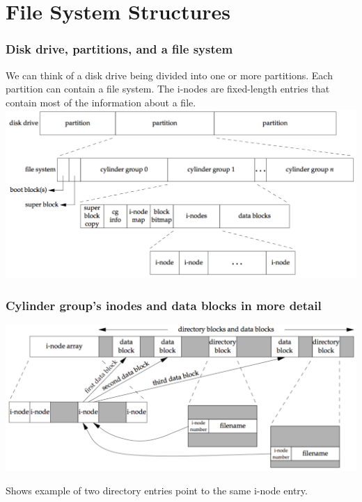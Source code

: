 \documentclass[newPxFont,sthlmFooter,nooffset]{beamer}
\begin{document}
\section{File System Structures}


\begin{frame}
  \frametitle{Disk drive, partitions, and a file system}
We can think of a disk drive being divided into one or more partitions. Each partition can contain a file system. The i-nodes are fixed-length entries that contain most of the information about a file.
\includegraphics[width=\textwidth]{figure/fig4_13_disk.png}  
\end{frame}



\begin{frame}
  \frametitle{Cylinder group's inodes and data blocks in more detail}
\includegraphics[width=\textwidth]{figure/fig4_14_cylinder.png}  

Shows example of two directory entries point to the same i-node
  entry.
\end{frame}
\end{document}
